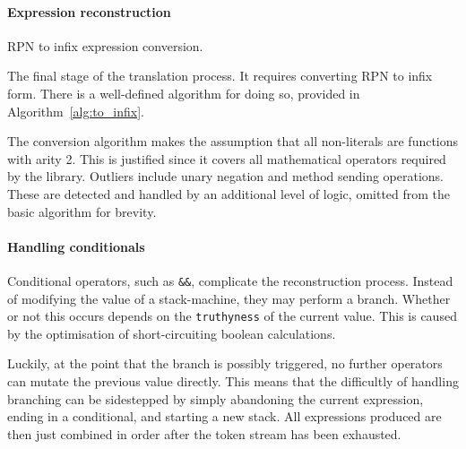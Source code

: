 \paragraph*{Expression reconstruction}

\begin{algorithm}[h]
  \caption{\ac{RPN} to infix expression conversion.}
  \label{alg:to_infix}

  \begin{algorithmic}
    \Else
    \EndIf
    \EndWhile
    \EndFunction
  \end{algorithmic}
\end{algorithm}

The final stage of the translation process. It requires converting \ac{RPN} to infix form.
There is a well-defined algorithm for doing so, provided in Algorithm~\ref{alg:to_infix}.

The conversion algorithm makes the assumption that all non-literals are functions with arity 2. This is justified since it covers all mathematical operators required by the library. Outliers include unary negation and method sending operations. These are detected and handled by an additional level of logic, omitted from the basic algorithm for brevity.

\paragraph*{Handling conditionals}
Conditional operators, such as \verb|&&|, complicate the reconstruction process. Instead of modifying the value of a stack-machine, they may perform a branch. Whether or not this occurs depends on the \verb|truthyness| of the current value. This is caused by the optimisation of short-circuiting boolean calculations.

Luckily, at the point that the branch is possibly triggered, no further operators can mutate the previous value directly. This means that the difficultly of handling branching can be sidestepped by simply abandoning the current expression, ending in a conditional, and starting a new stack. All expressions produced are then just combined in order after the token stream has been exhausted.

